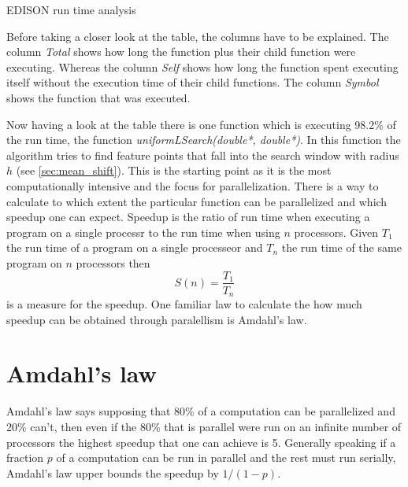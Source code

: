 \begin{table}[ht]
  \centering
  \caption[EDISON run time profile]{ \gls{EDISON} run time analysis}
  \label{tab:comped}
\end{table}

Before taking a closer look at the table, the columns have to be
explained. The column \emph{Total} shows how long the function plus
their child function were executing. Whereas the column \emph{Self}
shows how long the function spent executing itself without the
execution time of their child functions. The column \emph{Symbol}
shows the function that was executed.

Now having a look at the table there is one function which is
executing 98.2\% of the run time, the function
\emph{uniformLSearch(double*, double*)}. In this function the
algorithm tries to find feature points that fall into the search
window with radius $h$ (see \autoref{sec:mean_shift}). This is the
starting point as it is the most computationally intensive and the
focus for parallelization. There is a way to calculate to which extent
the particular function can be parallelized and which speedup one can
expect. Speedup is the ratio of run time when executing a program on a
single processr to the run time when using $n$ processors. Given $T_1$
the run time of a program on a single processeor and $T_n$ the run
time of the same program on $n$ processors then
\begin{equation}\label{eq:speedup}
  S(n) = \frac{T_1}{T_n}
\end{equation}
is a measure for the speedup. One familiar law to calculate the how
much speedup can be obtained through paralellism is Amdahl's law.

\section{Amdahl's law}
\label{sec:amdahl_s_law}
Amdahl's law says supposing that 80\% of a computation can be
parallelized and 20\% can't, then even if the 80\% that is parallel
were run on an infinite number of processors the highest speedup that
one can achieve is 5. Generally speaking if a fraction $p$ of a
computation can be run in parallel and the rest must run serially,
Amdahl's law upper bounds the speedup by $1/(1-p)$.

